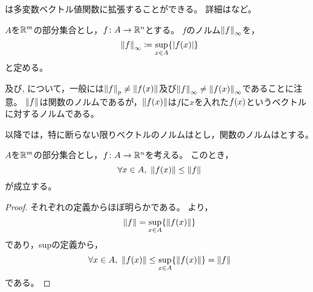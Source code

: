 \documentclass[b5paper,draft]{ltjsbook}
\begin{document}
\begin{supple}
    は多変数ベクトル値関数に拡張することができる。
    詳細は\cite{nomura}など。
\end{supple}

\begin{defi}
    $A$を$\mathbb{R}^m$の部分集合とし，$f\colon A\to \mathbb{R}^n$とする。
    $f$のノルム$\norm{f}_\infty$を，
    \begin{equation}
        \norm{f}_\infty \coloneqq \sup_{x \in A}\bra{ \abs{\fun{f}{x}} }
    \end{equation}
    と定める。
\end{defi}

\begin{rem}
    及び, について，一般には$\norm{f}_p\ne\norm{\fun{f}{x}}$及び$\norm{f}_\infty\ne\norm{\fun{f}{x}}_\infty$であることに注意。
    $\norm{f}$は関数のノルムであるが，$\norm{\fun{f}{x}}$は$f$に$x$を入れた$\fun{f}{x}$というベクトルに対するノルムである。
\end{rem}

以降では，特に断らない限りベクトルのノルムはとし，関数のノルムはとする。

\begin{lem}
    $A$を$\mathbb{R}^m$の部分集合とし，$f\colon A\to \mathbb{R}^n$を考える。
    このとき，
    \begin{equation}
        \forall x\in A,\ \norm{\fun{f}{x}}\leq \norm{f}
    \end{equation}
    が成立する。
    \begin{proof}
        それぞれの定義からほぼ明らかである。
        より，
        \begin{equation}
            \norm{f} = \sup_{x \in A}\bra{ \norm{\fun{f}{x}} }
        \end{equation}
        であり，supの定義から，
        \begin{equation}
            \forall x\in A,\  \norm{\fun{f}{x}}\leq \sup_{x \in A}\bra{ \norm{\fun{f}{x}} } = \norm{f}
        \end{equation}
        である。
    \end{proof}
\end{lem}
\end{document}
